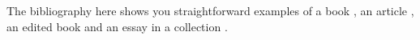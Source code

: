 The bibliography here shows you straightforward examples of a book \autocite{worman}, an article \autocite{reese}, an edited book \autocite{aristotle:anima} and an essay in a collection \autocite{gaonkar:in}.